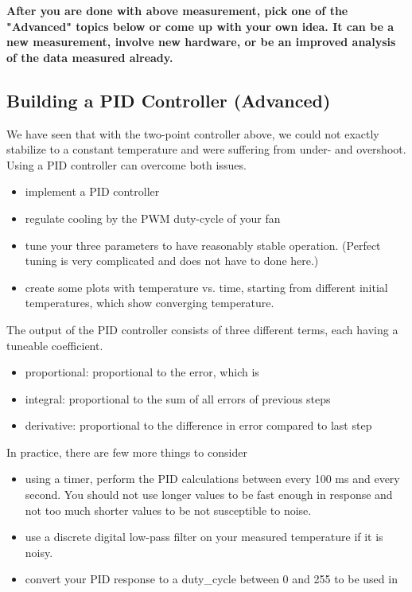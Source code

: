\textbf{After you are done with above measurement, pick one of the "Advanced" topics below or come up with your own idea. It can be a new measurement, involve new hardware, or be an improved analysis of the data measured already.}

\subsection{Building a PID Controller (Advanced)}
We have seen that with the two-point controller above, we could not exactly stabilize to a constant temperature and were suffering from under- and overshoot. Using a \ac{PID} controller can overcome both issues.
\begin{itemize}
	\item implement a \ac{PID} controller
	\item regulate cooling by the PWM duty-cycle of your fan
	\item tune your three parameters to have reasonably stable operation. (Perfect tuning is very complicated and does not have to done here.)
	\item create some plots with temperature vs. time, starting from different initial temperatures, which show converging temperature.
\end{itemize}

The output of the PID controller consists of three different terms, each having a tuneable coefficient.
\begin{itemize}
	\item proportional: proportional to the error, which is 
	\item integral: proportional to the sum of all errors of previous steps
	\item derivative: proportional to the difference in error compared to last step
\end{itemize}

In practice, there are few more things to consider
\begin{itemize}
    \item using a timer, perform the PID calculations between every 100 ms and every second. You should not use longer values to be fast enough in response and not too much shorter values to be not susceptible to noise.
    \item use a discrete digital low-pass filter on your measured temperature if it is noisy.
    \item convert your PID response to a duty\_cycle between 0 and 255 to be used in 
\end{itemize}

